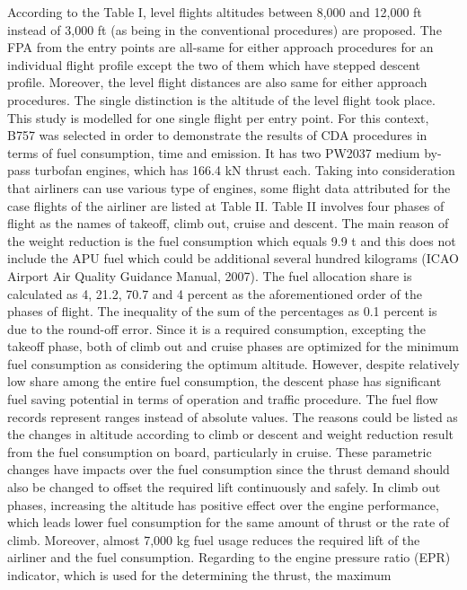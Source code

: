 \documentclass{aer1315-pretty}
\begin{document}
\begin{itemize}
According to the Table I, level flights altitudes between 8,000
and 12,000 ft instead of 3,000 ft (as being in the conventional
procedures) are proposed. The FPA from the entry points are
all-same for either approach procedures for an individual
flight profile except the two of them which have stepped
descent profile. Moreover, the level flight distances are also
same for either approach procedures. The single distinction is
the altitude of the level flight took place.
   This study is modelled for one single flight per entry point.
For this context, B757 was selected in order to demonstrate
the results of CDA procedures in terms of fuel consumption,
time and emission. It has two PW2037 medium by-pass
turbofan engines, which has 166.4 kN thrust each. Taking
into consideration that airliners can use various type of
engines, some flight data attributed for the case flights of the
airliner are listed at Table II.
   Table II involves four phases of flight as the names of takeoff,
climb out, cruise and descent. The main reason of the weight
reduction is the fuel consumption which equals 9.9 t and this
does not include the APU fuel which could be additional several
hundred kilograms (ICAO Airport Air Quality Guidance Manual,
2007). The fuel allocation share is calculated as 4, 21.2, 70.7
and 4 percent as the aforementioned order of the phases of
flight. The inequality of the sum of the percentages as 0.1
percent is due to the round-off error. Since it is a required
consumption, excepting the takeoff phase, both of climb out
and cruise phases are optimized for the minimum fuel
consumption as considering the optimum altitude. However,
despite relatively low share among the entire fuel consumption,
the descent phase has significant fuel saving potential in terms of
operation and traffic procedure.
   The fuel flow records represent ranges instead of absolute
values. The reasons could be listed as the changes in altitude
according to climb or descent and weight reduction result from
the fuel consumption on board, particularly in cruise. These
parametric changes have impacts over the fuel consumption
since the thrust demand should also be changed to offset the
required lift continuously and safely. In climb out phases,
increasing the altitude has positive effect over the engine
performance, which leads lower fuel consumption for the same
amount of thrust or the rate of climb. Moreover, almost
7,000 kg fuel usage reduces the required lift of the airliner and
the fuel consumption.
   Regarding to the engine pressure ratio (EPR) indicator,
which is used for the determining the thrust, the maximum

\end{itemize}
\end{document}
